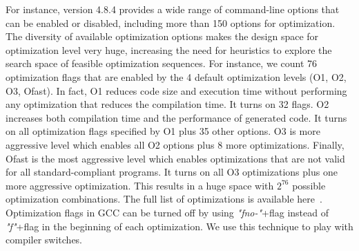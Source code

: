 For instance, version 4.8.4 provides a wide range of command-line options that can be enabled or disabled, including more than 150 options for optimization. The diversity of available optimization options makes the design space for optimization level very huge, increasing the need for heuristics to explore the search space of feasible optimization sequences.
For instance, we count 76 optimization flags that are enabled by the 4 default optimization levels (O1, O2, O3, Ofast). 
In fact, O1 reduces code size and execution time without performing any optimization that reduces the compilation time. It turns on 32 flags. 
O2 increases both compilation time and the performance of generated code. It turns on all optimization flags specified by O1 plus 35 other options. 
O3 is more aggressive level which enables all O2 options plus 8 more optimizations. 
Finally, Ofast is the most aggressive level which enables optimizations that are not valid for all standard-compliant programs. It turns on all O3 optimizations plus one more aggressive optimization. 
This results in a huge space with $2^{76}$ possible optimization combinations. The full list of optimizations is available here~\cite{mboussaa}.
Optimization flags in GCC can be turned off by using \textit{"fno-"}+flag instead of \textit{"f"}+flag in the beginning of each optimization. 
We use this technique to play with compiler switches.
\iffalse
